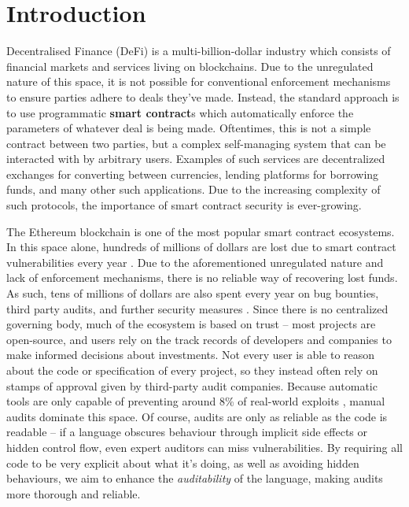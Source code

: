 \chapter{Introduction}\label{ch:paper_introduction}

Decentralised Finance (DeFi) is a multi-billion-dollar industry which consists of financial markets and services living on blockchains. Due to the unregulated nature of this space, it is not possible for conventional enforcement mechanisms to ensure parties adhere to deals they've made. Instead, the standard approach is to use programmatic \textbf{smart contract}s which automatically enforce the parameters of whatever deal is being made. Oftentimes, this is not a simple contract between two parties, but a complex self-managing system that can be interacted with by arbitrary users. Examples of such services are decentralized exchanges for converting between currencies, lending platforms for borrowing funds, and many other such applications. Due to the increasing complexity of such protocols, the importance of smart contract security is ever-growing.
\par
The Ethereum blockchain \cite{yellowpaper} is one of the most popular smart contract ecosystems. In this space alone, hundreds of millions of dollars are lost due to smart contract vulnerabilities every year \cite{immunefi} \cite{chainalysis} \cite{slowmist}. Due to the aforementioned unregulated nature and lack of enforcement mechanisms, there is no reliable way of recovering lost funds. As such, tens of millions of dollars are also spent every year on bug bounties, third party audits, and further security measures \cite{immunefi}. Since there is no centralized governing body, much of the ecosystem is based on trust -- most projects are open-source, and users rely on the track records of developers and companies to make informed decisions about investments. Not every user is able to reason about the code or specification of every project, so they instead often rely on stamps of approval given by third-party audit companies. Because automatic tools are only capable of preventing around 8\% of real-world exploits \cite{tool-efficacy}, manual audits dominate this space. Of course, audits are only as reliable as the code is readable -- if a language obscures behaviour through implicit side effects or hidden control flow, even expert auditors can miss vulnerabilities. By requiring all code to be very explicit about what it's doing, as well as avoiding hidden behaviours, we aim to enhance the \textit{auditability} of the language, making audits more thorough and reliable.
